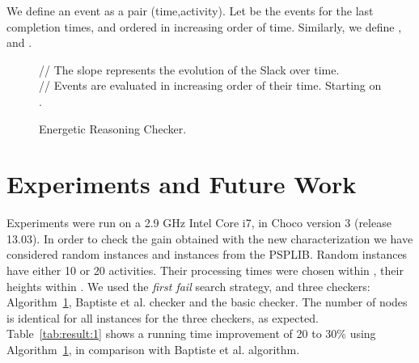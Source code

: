 \documentclass{llncs}
\begin{document}
We define an event as a pair (time,activity). Let  be the events for the last completion times,
 and ordered in increasing order of time. 
Similarly, we define 
,
 and
.
\vspace{-0.5cm}
\begin{figure}[h]
\begin{minipage}{0.6\textwidth}  
\begin{algorithm}[H]
{\scriptsize
	\caption{Energetic Reasoning Checker.}
	\label{algo:ERChecker}
}
\end{algorithm}
\end{minipage}
\begin{minipage}{0.4\textwidth}  

// The slope represents the evolution of the Slack over time. \\
// Events are evaluated in increasing order of their time. Starting on .


\end{minipage}
\vspace{-1cm}
\end{figure}









 \section{Experiments and Future Work}
Experiments were run on a 2.9 GHz Intel Core i7, in Choco \cite{choco2010} version 3 (release 13.03).
In order to check the gain obtained with  the new characterization we have considered random instances and instances from the PSPLIB\cite{Kolisch96psplib}. 
Random instances have either 10 or 20 activities. Their processing times were chosen within , their heights within .
We used the \emph{first fail} \cite{haralick:ai80} search strategy, and three checkers:  Algorithm~\ref{algo:ERChecker}, Baptiste et al. checker  and the basic  checker. 
The number of nodes is identical for all instances  for the three checkers, as expected.
Table~\ref{tab:result:1} shows a running time improvement of  20 to 30\% using Algorithm~\ref{algo:ERChecker}, in comparison with Baptiste et al. algorithm. 
\end{document}
